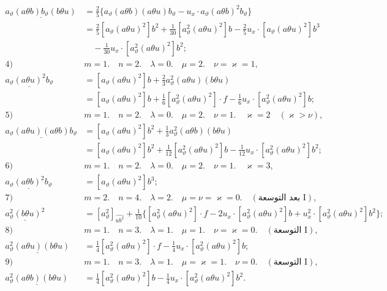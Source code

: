 \documentclass[11pt]{article}
\begin{document}
\[
\begin{aligned}
\underline{a_\vartheta(a\theta b)b_\vartheta(b\theta u)}
&=\frac25\{a_\vartheta(a\theta b)(a\theta u)b_\vartheta-u_x\cdot a_\vartheta(a\theta b)^2b_\vartheta\}\\
&=\frac25[a_\vartheta(a\theta u)^2]b^2+\frac1{30}[a_\vartheta^2(a\theta u)^2]b-\frac25u_x\cdot[a_\vartheta(a\theta u)^2]b^3\\
&\quad-\frac1{30}u_x\cdot[a_\vartheta^2(a\theta u)^2]b^2;\\[0.7em]
\text{4)}\quad&m=1.\quad n=2.\quad \lambda=0.\quad \mu=2.\quad \nu=\varkappa=1,\\[0.25em]
\underline{a_\vartheta(a\theta u)^2b_\vartheta}
&=[a_\vartheta(a\theta u)^2]b+\frac23a_\vartheta^2(a\theta u)(b\theta u)\\
&=[a_\vartheta(a\theta u)^2]b+\frac16[a_\vartheta^2(a\theta u)^2]\cdot f-\frac16u_x\cdot[a_\vartheta^2(a\theta u)^2]b;\\[0.7em]
\text{5)}\quad&m=1.\quad n=2.\quad \lambda=0.\quad \mu=2.\quad \nu=1.\quad \varkappa=2\quad(\varkappa>\nu),\\[0.25em]
\underline{a_\vartheta(a\theta u)(a\theta b)b_\vartheta}
&=[a_\vartheta(a\theta u)^2]b^2+\frac13a_\vartheta^2(a\theta b)(b\theta u)\\
&=[a_\vartheta(a\theta u)^2]b^2+\frac1{12}[a_\vartheta^2(a\theta u)^2]b-\frac1{12}u_x\cdot[a_\vartheta^2(a\theta u)^2]b^2;\\[0.7em]
\text{6)}\quad&m=1.\quad n=2.\quad \lambda=0.\quad \mu=2.\quad \nu=1.\quad \varkappa=3,\\[0.25em]
\underline{a_\vartheta(a\theta b)^2b_\vartheta}&=[a_\vartheta(a\theta u)^2]b^3;\\[0.7em]
\text{7)}\quad&m=2.\quad n=4.\quad \lambda=2.\quad \mu=\nu=\varkappa=0.\quad(\text{بعد التوسعة I}),\\[0.25em]
\underline{a_\vartheta^2(b\theta u)^2}&=[a_\vartheta^2]_{\widehat{ub^2}}+\frac1{10}\{[a_\vartheta^2(a\theta u)^2]\cdot f-2u_x\cdot[a_\vartheta^2(a\theta u)^2]b+u_x^2\cdot[a_\vartheta^2(a\theta u)^2]b^2\};\\[0.7em]
\text{8)}\quad&m=1.\quad n=3.\quad \lambda=1.\quad \mu=1.\quad \nu=\varkappa=0.\quad(\text{التوسعة I}),\\[0.25em]
\underline{a_\vartheta^2(a\theta u)(b\theta u)}&=\frac14[a_\vartheta^2(a\theta u)^2]\cdot f-\frac14u_x\cdot[a_\vartheta^2(a\theta u)^2]b;\\[0.7em]
\text{9)}\quad&m=1.\quad n=3.\quad \lambda=1.\quad \mu=\varkappa=1.\quad \nu=0.\quad(\text{التوسعة I}),\\[0.25em]
\underline{a_\vartheta^2(a\theta b)(b\theta u)}&=\frac14[a_\vartheta^2(a\theta u)^2]b-\frac14u_x\cdot[a_\vartheta^2(a\theta u)^2]b^2.
\end{aligned}
\]
\end{document}
